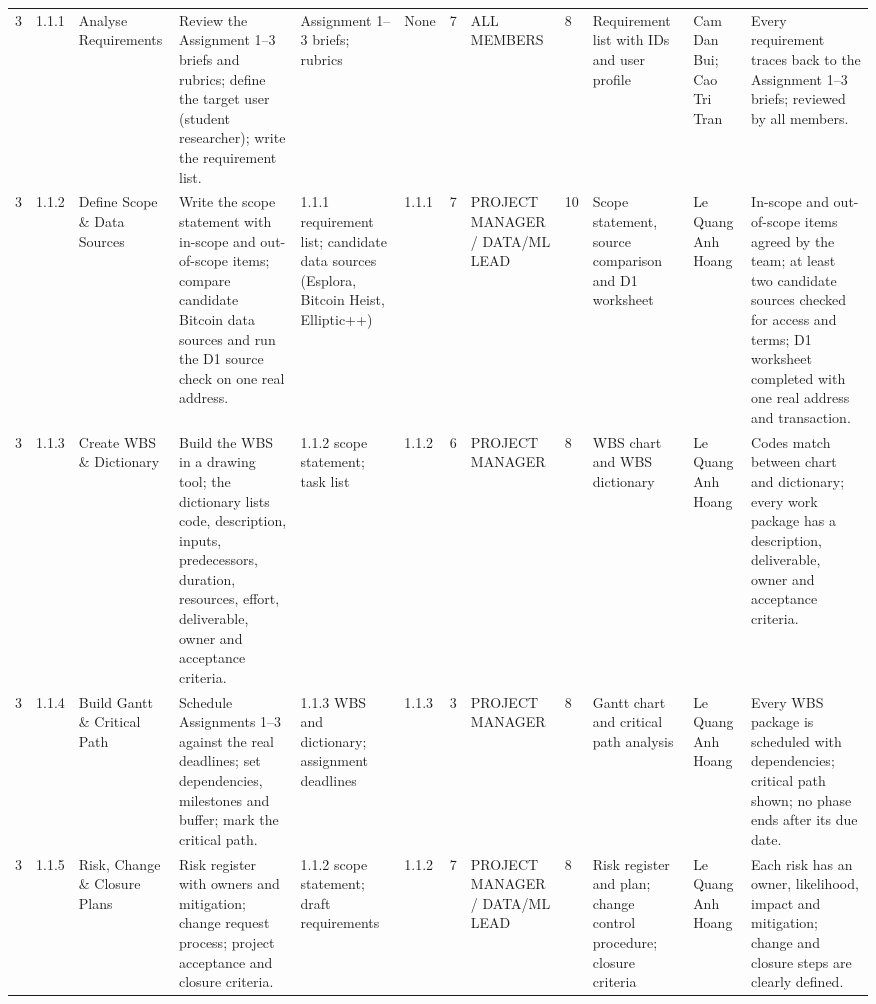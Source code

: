 \begin{landscape}
{\begin{xltabular}{\linewidth}{@{}P{0.9cm} P{1.0cm} P{1.9cm} Z P{2.2cm} P{1.6cm} P{1.1cm} P{1.9cm} P{1.2cm} P{2.2cm} P{1.85cm} Z@{}}
3 & 1.1.1 & Analyse Requirements & Review the Assignment 1–3 briefs and rubrics; define the target user (student researcher); write the requirement list. & Assignment 1–3 briefs; rubrics & None & 7 & ALL MEMBERS & 8 & Requirement list with IDs and user profile & Cam Dan Bui; Cao Tri Tran & Every requirement traces back to the Assignment 1–3 briefs; reviewed by all members. \\
3 & 1.1.2 & Define Scope \& Data Sources & Write the scope statement with in-scope and out-of-scope items; compare candidate Bitcoin data sources and run the D1 source check on one real address. & 1.1.1 requirement list; candidate data sources (Esplora, Bitcoin Heist, Elliptic++) & 1.1.1 & 7 & PROJECT MANAGER /\allowbreak{} DATA/\allowbreak{}ML LEAD & 10 & Scope statement, source comparison and D1 worksheet & Le Quang Anh Hoang & In-scope and out-of-scope items agreed by the team; at least two candidate sources checked for access and terms; D1 worksheet completed with one real address and transaction. \\
3 & 1.1.3 & Create WBS \& Dictionary & Build the WBS in a drawing tool; the dictionary lists code, description, inputs, predecessors, duration, resources, effort, deliverable, owner and acceptance criteria. & 1.1.2 scope statement; task list & 1.1.2 & 6 & PROJECT MANAGER & 8 & WBS chart and WBS dictionary & Le Quang Anh Hoang & Codes match between chart and dictionary; every work package has a description, deliverable, owner and acceptance criteria. \\
3 & 1.1.4 & Build Gantt \& Critical Path & Schedule Assignments 1–3 against the real deadlines; set dependencies, milestones and buffer; mark the critical path. & 1.1.3 WBS and dictionary; assignment deadlines & 1.1.3 & 3 & PROJECT MANAGER & 8 & Gantt chart and critical path analysis & Le Quang Anh Hoang & Every WBS package is scheduled with dependencies; critical path shown; no phase ends after its due date. \\
3 & 1.1.5 & Risk, Change \& Closure Plans & Risk register with owners and mitigation; change request process; project acceptance and closure criteria. & 1.1.2 scope statement; draft requirements & 1.1.2 & 7 & PROJECT MANAGER /\allowbreak{} DATA/\allowbreak{}ML LEAD & 8 & Risk register and plan; change control procedure; closure criteria & Le Quang Anh Hoang & Each risk has an owner, likelihood, impact and mitigation; change and closure steps are clearly defined. \\

\end{xltabular}}
\end{landscape}
